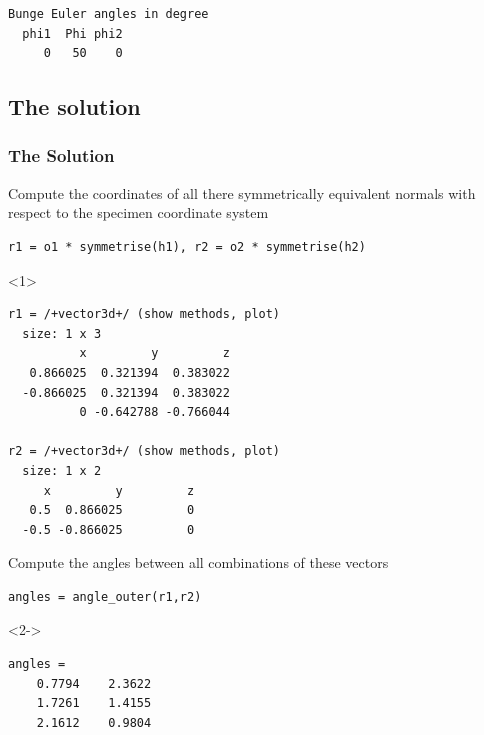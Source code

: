 \documentclass[compress]{beamer}
\begin{document}
\begin{frame}[fragile]
\begin{overlayarea}{\textwidth}{8cm}
\begin{onlyenv}
\begin{lstlisting}[style=output]
  Bunge Euler angles in degree
  phi1  Phi phi2
     0   50    0
\end{lstlisting}
  \end{onlyenv}

\end{overlayarea}

\end{frame}

\subsection*{The solution}

\begin{frame}[fragile]
  \frametitle{The Solution}
  \begin{overlayarea}{\textwidth}{8cm}

    Compute the coordinates of all there symmetrically equivalent normals with
    respect to the specimen coordinate system
 \begin{lstlisting}[style=input]
r1 = o1 * symmetrise(h1), r2 = o2 * symmetrise(h2)
 \end{lstlisting}
  \begin{onlyenv}<1>
\vspace{-.3cm}\begin{lstlisting}[style=output]
r1 = /+vector3d+/ (show methods, plot)
  size: 1 x 3
          x         y         z
   0.866025  0.321394  0.383022
  -0.866025  0.321394  0.383022
          0 -0.642788 -0.766044

r2 = /+vector3d+/ (show methods, plot)
  size: 1 x 2
     x         y         z
   0.5  0.866025         0
  -0.5 -0.866025         0
\end{lstlisting}
  \end{onlyenv}

  \medskip
  \pause

  Compute the angles between all combinations of these vectors
   \begin{lstlisting}[style=input]
angles = angle_outer(r1,r2)
   \end{lstlisting}
   \begin{onlyenv}<2->
     \vspace{-.3cm}
     \begin{lstlisting}[style=output]
angles =
    0.7794    2.3622
    1.7261    1.4155
    2.1612    0.9804
     \end{lstlisting}
   \end{onlyenv}

   \medskip
  \pause


\end{overlayarea}
\end{frame}
\end{document}
